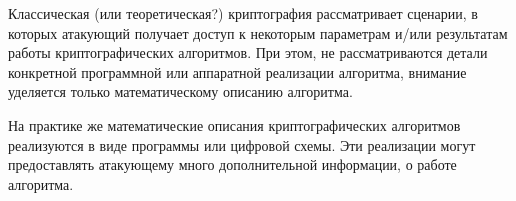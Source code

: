 Классическая (или теоретическая?) криптография рассматривает сценарии, в
которых атакующий получает доступ к некоторым параметрам и/или результатам
работы криптографических алгоритмов. При этом, не рассматриваются детали
конкретной программной или аппаратной реализации алгоритма, внимание уделяется
только математическому описанию алгоритма.

На практике же математические описания криптографических алгоритмов реализуются
в виде программы или цифровой схемы. Эти реализации могут предоставлять атакующему
много дополнительной информации, о работе алгоритма.
